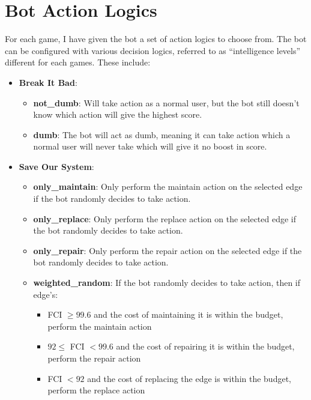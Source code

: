\documentclass[12pt,a4paper]{article}
\begin{document}
\section{Bot Action Logics}
\label{sec:bot-action-logics}
    For each game, I have given the bot a set of action logics to choose from. The bot can be configured with various decision logics, referred to as “intelligence levels” different for each games. These include:
    \begin{itemize}
        \item \textbf{Break It Bad}:
        \begin{itemize}
            \item \textbf{not\_dumb}: Will take action as a normal user, but the bot still doesn't know which action will give the highest score.
            \item \textbf{dumb}: The bot will act as dumb, meaning it can take action which a normal user will never take which will give it no boost in score.
        \end{itemize}
        
        \item \textbf{Save Our System}:
        \begin{itemize}
            \item \textbf{only\_maintain}: Only perform the maintain action on the selected edge if the bot randomly decides to take action.
            \item \textbf{only\_replace}: Only perform the replace action on the selected edge if the bot randomly decides to take action.
            \item \textbf{only\_repair}: Only perform the repair action on the selected edge if the bot randomly decides to take action.
            \item \textbf{weighted\_random}: If the bot randomly decides to take action, then if edge's:
                \begin{itemize}
                    \item FCI \(\geq 99.6\) and the cost of maintaining it is within the budget, perform the maintain action
                    \item \(92 \leq \) FCI \(< 99.6\) and the cost of repairing it is within the budget, perform the repair action
                    \item  FCI \(< 92\) and the cost of replacing the edge is within the budget, perform the replace action
                \end{itemize} 
        \end{itemize}
    \end{itemize}  
\end{document}
